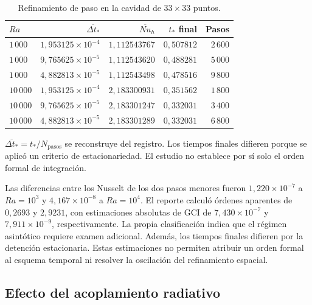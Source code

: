 \begin{table}[htbp]
\centering
\caption{Refinamiento de paso en la cavidad de $33\times33$ puntos.}
\label{tab:res_cavidad_temporal}
\small
\setlength{\tabcolsep}{5pt}
\begin{tabular}{lrrrr}
\toprule
$Ra$ & $\overline{\Delta t_*}$ & $\overline{Nu}_h$ & $t_*$ final & Pasos \\
\midrule
$1\,000$ & $1{,}953125\times10^{-4}$ & $1{,}112543767$ & $0{,}507812$ & $2\,600$ \\
$1\,000$ & $9{,}765625\times10^{-5}$ & $1{,}112543620$ & $0{,}488281$ & $5\,000$ \\
$1\,000$ & $4{,}882813\times10^{-5}$ & $1{,}112543498$ & $0{,}478516$ & $9\,800$ \\
$10\,000$ & $1{,}953125\times10^{-4}$ & $2{,}183300931$ & $0{,}351562$ & $1\,800$ \\
$10\,000$ & $9{,}765625\times10^{-5}$ & $2{,}183301247$ & $0{,}332031$ & $3\,400$ \\
$10\,000$ & $4{,}882813\times10^{-5}$ & $2{,}183301289$ & $0{,}332031$ & $6\,800$ \\
\bottomrule
\end{tabular}
\par\vspace{3pt}
\begin{minipage}{0.98\textwidth}\footnotesize
$\overline{\Delta t_*}=t_*/N_{\mathrm{pasos}}$ se reconstruye del registro. Los tiempos finales difieren porque se aplicó un criterio de estacionariedad. El estudio no establece por sí solo el orden formal de integración.
\end{minipage}
\end{table}


Las diferencias entre los Nusselt de los dos pasos menores fueron $1{,}220\times10^{-7}$ a $Ra=10^3$ y $4{,}167\times10^{-8}$ a $Ra=10^4$. El reporte calculó órdenes aparentes de $0{,}2693$ y $2{,}9231$, con estimaciones absolutas de GCI de $7{,}430\times10^{-7}$ y $7{,}911\times10^{-9}$, respectivamente. La propia clasificación indica que el régimen asintótico requiere examen adicional. Además, los tiempos finales difieren por la detención estacionaria. Estas estimaciones no permiten atribuir un orden formal al esquema temporal ni resolver la oscilación del refinamiento espacial.

\subsection{Efecto del acoplamiento radiativo}

